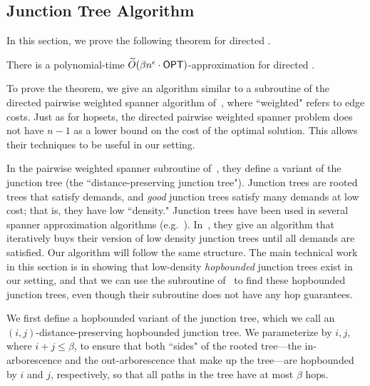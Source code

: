 
\subsection{Junction Tree Algorithm} \label{sec:junction_tree}

In this section, we prove the following theorem for directed {\hopset}.

\begin{theorem} \label{thm:junction_tree}
    There is a polynomial-time $\widetilde{O} (\beta n^\epsilon \cdot {{\sf OPT}})$-approximation for directed {\hopset}.
\end{theorem}

To prove the theorem, we give an algorithm similar to a subroutine of the directed pairwise weighted spanner algorithm of~\cite{GKL23}, where ``weighted" refers to edge costs. Just as for hopsets, the directed pairwise weighted spanner problem does not have $n-1$ as a lower bound on the cost of the optimal solution. This allows their techniques to be useful in our setting. 

In the pairwise weighted spanner subroutine of~\cite{GKL23}, they define a variant of the junction tree (the ``distance-preserving junction tree"). Junction trees are rooted trees that satisfy demands, and \textit{good} junction trees satisfy many demands at low cost; that is, they have low ``density." Junction trees have been used in several spanner approximation algorithms (e.g.~\cite{GKL23, CDKL20, GKL24}). In~\cite{GKL23}, they give an algorithm that iteratively buys their version of low density junction trees until all demands are satisfied. Our algorithm will follow the same structure. The main technical work in this section is in showing that low-density \textit{hopbounded} junction trees exist in our setting, and that we can use the subroutine of~\cite{GKL23} to find these hopbounded junction trees, even though their subroutine does not have any hop guarantees.

We first define a hopbounded variant of the junction tree, which we call an $(i,j)$-distance-preserving hopbounded junction tree. We parameterize by $i,j$, where $i+j \leq \beta$, to ensure that both ``sides" of the rooted tree---the in-arborescence and the out-arborescence that make up the tree---are hopbounded by $i$ and $j$, respectively, so that all paths in the tree have at most $\beta$ hops. 

